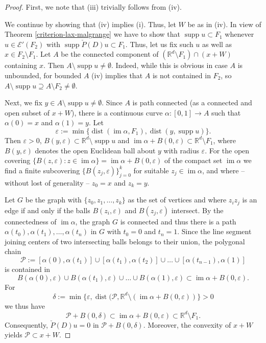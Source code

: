 \documentclass[10pt,leqno]{amsart}
\theoremstyle{definition}
\newcommand{\R}{\mathbb R}
\newcommand{\im}{\operatorname{im}}
\newcommand{\supp}{\operatorname{supp}}
\let\epsilon\varepsilon
\begin{document}
\begin{proof}
	First, we note that (iii) trivially follows from (iv).
	
	We continue by showing that (iv) implies (i). Thus, let $W$ be as in (iv). In view of Theorem \ref{criterion-lax-malgrange} we have to show that $\supp u\subset F_1$ whenever $u\in\mathscr{E}'(F_2)$ with $\supp \check P(D)u\subset F_1$. Thus, let us fix such $u$ as well as $x\in F_2\setminus F_1$. Let $A$ be the connected component of $(\R^d\setminus F_1)\cap (x+W)$ containing $x$. Then $A\setminus\supp u\neq\emptyset$. Indeed, while this is obvious in case $A$ is unbounded, for bounded $A$ (iv) implies that $A$ is not contained in $F_2$, so $A\setminus\supp u\supseteq A\setminus F_2\neq\emptyset$. 
	
	Next, we fix $y\in A\setminus\supp u\neq\emptyset$.
	Since $A$ is path connected (as a connected and open subset of $x+W$), there is a continuous curve $\alpha\colon[0,1]\to A$ such that $\alpha(0)=x$ and $\alpha(1)=y$. Let 
	$$\epsilon:=\min\{\operatorname{dist}(\im\alpha,F_1),\operatorname{dist}(y,\supp u)\}.$$
	Then $\epsilon>0$, $B(y,\epsilon)\subset\R^d\setminus\supp u$ and $\im\alpha+B(0,\epsilon)\subset\R^d\setminus F_1$, where $B(y,\varepsilon)$ denotes the open Euclidean ball about $y$ with radius $\varepsilon$. For the open covering $\{B(z,\epsilon)\colon z\in\im\alpha\}=\im\alpha+B(0,\epsilon)$ of the compact set $\im\alpha$ we find a finite subcovering $\{B(z_j,\epsilon)\}_{j=0}^{k}$
	for suitable $z_j\in\im\alpha$, and where -- without lost of generality -- $z_0=x$ and $z_k=y$. 
	
	Let $G$ be the graph with $\{z_0,z_1,\ldots,z_k\}$ as the set of vertices and where $z_iz_j$ is an edge if and only if the balls $B(z_i,\epsilon)$ and $B(z_j,\epsilon)$ intersect. By the connectedness of $\im\alpha$, the graph $G$ is connected and thus there is a path $\alpha(t_0),\alpha(t_1),\ldots,\alpha(t_n)$ in $G$ with $t_0=0$ and $t_n=1$. Since the line segment joining centers of two intersecting balls belongs to their union, the polygonal chain $$\mathcal{P}:=[\alpha(0),\alpha(t_1)]\cup[\alpha(t_1),\alpha(t_2)]\cup\ldots\cup[\alpha(t_{n-1}),\alpha(1)]$$ 
	is contained in 
	$$B(\alpha(0),\epsilon)\cup B(\alpha(t_1),\epsilon)\cup\ldots\cup B(\alpha(1),\epsilon)\subset\im\alpha+B(0,\epsilon).$$ 
	For 
	$$\delta:=\min\{\epsilon,\operatorname{dist}(\mathcal{P},\R^d\setminus(\im\alpha+B(0,\epsilon))\}>0$$
	we thus have 
	$$\mathcal{P}+B(0,\delta)\subset\im\alpha+B(0,\epsilon)\subset\R^d\setminus F_1.$$
	Consequently, $\check P(D)u=0$ in $\mathcal{P}+B(0,\delta)$. 
	Moreover, the convexity of $x+W$ yields $\mathcal{P}\subset x+W$.
	

\end{proof}
\end{document}
